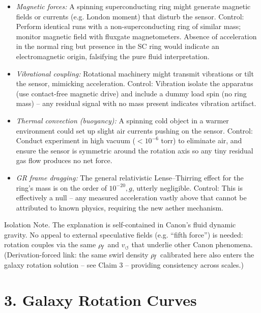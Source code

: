 \documentclass[11pt]{article}
\begin{document}
\begin{itemize}

\item 
\textit{Magnetic forces:} A spinning superconducting ring might generate magnetic fields or currents (e.g. London moment) that disturb the sensor. Control: Perform identical runs with a non-superconducting ring of similar mass; monitor magnetic field with fluxgate magnetometers. Absence of acceleration in the normal ring but presence in the SC ring would indicate an electromagnetic origin, falsifying the pure fluid interpretation.




\item 
\textit{Vibrational coupling:} Rotational machinery might transmit vibrations or tilt the sensor, mimicking acceleration. Control: Vibration isolate the apparatus (use contact-free magnetic drive) and include a dummy load spin (no ring mass) – any residual signal with no mass present indicates vibration artifact.




\item 
\textit{Thermal convection (buoyancy):} A spinning cold object in a warmer environment could set up slight air currents pushing on the sensor. Control: Conduct experiment in high vacuum ($<10^{-6}$ torr) to eliminate air, and ensure the sensor is symmetric around the rotation axis so any tiny residual gas flow produces no net force.




\item 
\textit{GR frame dragging:} The general relativistic Lense–Thirring effect for the ring’s mass is on the order of $10^{-20},g$, utterly negligible. Control: This is effectively a null – any measured acceleration vastly above that cannot be attributed to known physics, requiring the new aether mechanism.




\end{itemize}

Isolation Note. The explanation is self-contained in Canon’s fluid dynamic gravity. No appeal to external speculative fields (e.g. “fifth force”) is needed: rotation couples via the same $\rho_{\!f}$ and $v_{\circlearrowleft}$ that underlie other Canon phenomena. (Derivation-forced link: the same swirl density $\rho_{\!f}$ calibrated here also enters the galaxy rotation solution – see Claim 3 – providing consistency across scales.)


\section*{3. Galaxy Rotation Curves}
\end{document}
